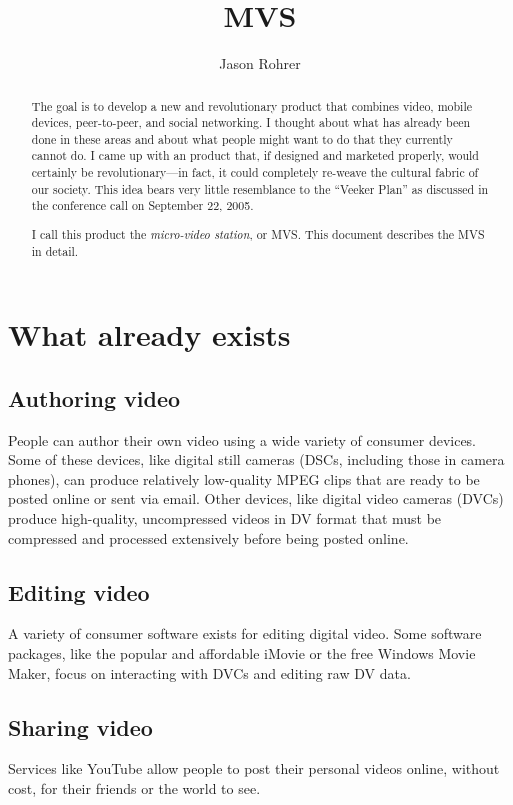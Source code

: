 \documentclass[12pt]{article}
\begin{document}
\title{MVS}

\author{Jason Rohrer}

\maketitle

\begin{abstract}
The goal is to develop a new and revolutionary product that combines video, mobile devices, peer-to-peer, and social networking.  
I thought about what has already been done in these areas and about what people might want to do that they currently cannot do.
I came up with an product that, if designed and marketed properly, would certainly be revolutionary---in fact, it could completely re-weave the cultural fabric of our society.
This idea bears very little resemblance to the ``Veeker Plan'' as discussed in the conference call on September 22, 2005.
  
I call this product the {\it micro-video station}, or MVS.
This document describes the MVS in detail.
\end{abstract}

\section{What already exists}

\subsection{Authoring video}
People can author their own video using a wide variety of consumer devices.
Some of these devices, like digital still cameras (DSCs, including those in camera phones), can produce relatively low-quality MPEG clips that are ready to be posted online or sent via email.
Other devices, like digital video cameras (DVCs) produce high-quality, uncompressed videos in DV format that must be compressed and processed extensively before being posted online.

\subsection{Editing video}
A variety of consumer software exists for editing digital video.
Some software packages, like the popular and affordable iMovie or the free Windows Movie Maker, focus on interacting with DVCs and editing raw DV data.

\subsection{Sharing video}
Services like YouTube allow people to post their personal videos online, without cost, for their friends or the world to see.
\end{document}
